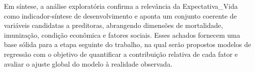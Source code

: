 \documentclass[
  12pt,
]{article}
\begin{document}
Em síntese, a análise exploratória confirma a relevância da
Expectativa\_Vida como indicador-síntese de desenvolvimento e aponta um
conjunto coerente de variáveis candidatas a preditoras, abrangendo
dimensões de mortalidade, imunização, condição econômica e fatores
sociais. Esses achados fornecem uma base sólida para a etapa seguinte do
trabalho, na qual serão propostos modelos de regressão com o objetivo de
quantificar a contribuição relativa de cada fator e avaliar o ajuste
global do modelo à realidade observada.
\end{document}
